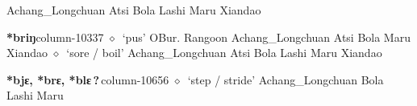 \hspace{1ex}
         Achang\_Longchuan 
\hspace{1ex}
         Atsi 
\hspace{1ex}
         Bola 
\hspace{1ex}
         Lashi 
\hspace{1ex}
         Maru 
\hspace{1ex}
         Xiandao 
  \item {\footnotesize \textbf{*briŋ}}{\tiny column-10337}
         $\diamond$~`pus'
         OBur. 
\hspace{1ex}
         Rangoon 
\hspace{1ex}
         Achang\_Longchuan 
\hspace{1ex}
         Atsi 
\hspace{1ex}
         Bola 
\hspace{1ex}
         Maru 
\hspace{1ex}
         Xiandao 
\hspace{1ex}
         $\diamond$~`sore / boil'
         Achang\_Longchuan 
\hspace{1ex}
         Atsi 
\hspace{1ex}
         Bola 
\hspace{1ex}
         Lashi 
\hspace{1ex}
         Maru 
\hspace{1ex}
         Xiandao 
  \item {\footnotesize \textbf{*bjɛ, *brɛ, *blɛ\,?\,}}{\tiny column-10656}
         $\diamond$~`step / stride'
         Achang\_Longchuan 
\hspace{1ex}
         Bola 
\hspace{1ex}
         Lashi 
\hspace{1ex}
         Maru 
